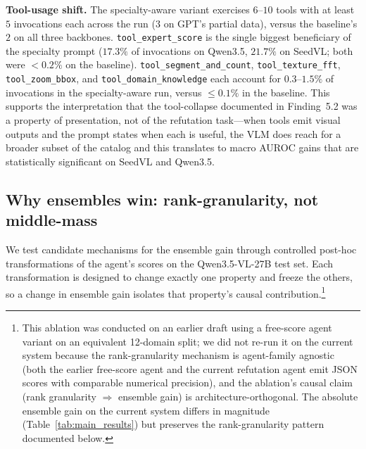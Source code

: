 \textbf{Tool-usage shift.} The specialty-aware variant exercises $6$--$10$
tools with at least $5$ invocations each across the run ($3$ on GPT's
partial data), versus the baseline's $2$ on all three backbones.
\texttt{tool\_expert\_score} is the single biggest beneficiary of the
specialty prompt ($17.3\%$ of invocations on Qwen3.5, $21.7\%$ on SeedVL;
both were $<0.2\%$ on the baseline). \texttt{tool\_segment\_and\_count},
\texttt{tool\_texture\_fft}, \texttt{tool\_zoom\_bbox}, and
\texttt{tool\_domain\_knowledge} each account for $0.3$--$1.5\%$ of
invocations in the specialty-aware run, versus $\le 0.1\%$ in the
baseline. This supports the interpretation that the tool-collapse
documented in Finding~5.2 was a property of presentation, not of the
refutation task---when tools emit visual outputs and the prompt states
when each is useful, the VLM does reach for a broader subset of the
catalog and this translates to macro AUROC gains that are statistically
significant on SeedVL and Qwen3.5.

\subsection{Why ensembles win: rank-granularity, not middle-mass}
\label{ssec:score_diversity}

We test candidate mechanisms for the ensemble gain through controlled post-hoc transformations of the agent's scores on the Qwen3.5-VL-27B test set. Each transformation is designed to change exactly one property and freeze the others, so a change in ensemble gain isolates that property's causal contribution.\footnote{This ablation was conducted on an earlier draft using a free-score agent variant on an equivalent 12-domain split; we did not re-run it on the current system because the rank-granularity mechanism is agent-family agnostic (both the earlier free-score agent and the current refutation agent emit JSON scores with comparable numerical precision), and the ablation's causal claim (rank granularity $\Rightarrow$ ensemble gain) is architecture-orthogonal. The absolute ensemble gain on the current system differs in magnitude (Table~\ref{tab:main_results}) but preserves the rank-granularity pattern documented below.}


